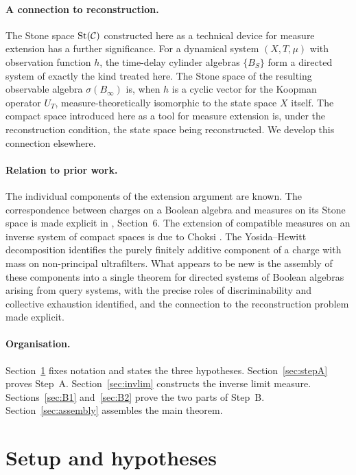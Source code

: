 \paragraph{A connection to reconstruction.}
The Stone space $\mathrm{St}(\mathcal{C})$ constructed here as a technical device for measure
extension has a further significance.  For a dynamical system $(X, T, \mu)$ with
observation function $h$, the time-delay cylinder algebras $\{B_S\}$ form a directed
system of exactly the kind treated here.  The Stone space of the resulting observable
algebra $\sigma(B_\infty)$ is, when $h$ is a cyclic vector for the Koopman operator
$U_T$, measure-theoretically isomorphic to the state space $X$ itself.  The compact
space introduced here as a tool for measure extension is, under the reconstruction
condition, the state space being reconstructed.  We develop this connection elsewhere.

\paragraph{Relation to prior work.}
The individual components of the extension argument are known.  The correspondence
between charges on a Boolean algebra and measures on its Stone space is made explicit
in \cite{cardona2025}, Section~6.  The extension of compatible measures on an inverse
system of compact spaces is due to Choksi \cite{choksi1958}.  The Yosida--Hewitt
decomposition \cite{yosida1952} identifies the purely finitely additive component of a
charge with mass on non-principal ultrafilters.  What appears to be new is the
assembly of these components into a single theorem for directed systems of Boolean
algebras arising from query systems, with the precise roles of discriminability and
collective exhaustion identified, and the connection to the reconstruction problem
made explicit.

\paragraph{Organisation.}
Section~\ref{sec:setup} fixes notation and states the three hypotheses.
Section~\ref{sec:stepA} proves Step~A.  Section~\ref{sec:invlim} constructs the
inverse limit measure.  Sections~\ref{sec:B1} and~\ref{sec:B2} prove the two parts of
Step~B.  Section~\ref{sec:assembly} assembles the main theorem.

\section{Setup and hypotheses}
\label{sec:setup}

